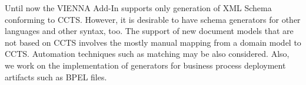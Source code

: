 \documentclass{acm_proc_article-sp}
\begin{document}
Until now the VIENNA Add-In supports only generation of XML Schema conforming to CCTS. However, it is desirable to have schema generators for other languages and other syntax, too. The support of new document models that are not based on CCTS involves the mostly manual mapping from a domain model to CCTS. Automation techniques such as matching may be also considered. Also, we work on the implementation of generators for business process deployment artifacts such as BPEL files.









  
\end{document}
